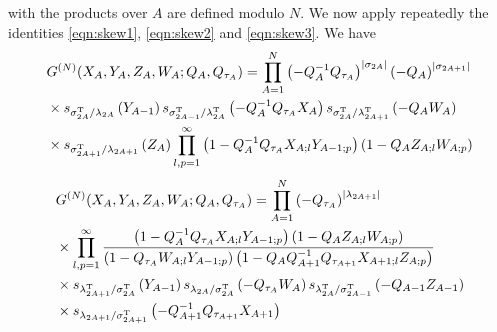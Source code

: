 \documentclass[main.tex]{subfiles}
\begin{document}
with the products over $A$ are defined modulo $N$. We now apply repeatedly the identities \eqref{eqn:skew1}, \eqref{eqn:skew2} and \eqref{eqn:skew3}.
We have
\begin{equation}
\begin{aligned}
&G^{(N)}(X_A,Y_A,Z_A,W_A;Q_A,Q_{\tau_A})=\prod_{A=1}^N\left(-Q^{-1}_{A}Q_{\tau_{A}}\right)^{|\sigma_{2A}|}\left(-Q_A\right)^{|\sigma_{2A+1}|}\\
&\times s_{\sigma_{2A}^{\operatorname{T}}/\lambda_{2A}}\left(Y_{A-1}\right)s_{\sigma_{2A-1}^{\operatorname{T}}/\lambda_{2A}^{\operatorname{T}}}\left(-Q^{-1}_{A}Q_{\tau_{A}}X_A\right)s_{\sigma_{2A}^{\operatorname{T}}/\lambda_{2A+1}^{\operatorname{T}}}\left(-Q_{A}W_A\right)\\
&\times s_{\sigma_{2A+1}^{\operatorname{T}}/\lambda_{2A+1}}\left(Z_{A}\right)\prod_{l,p=1}^{\infty}\left(1-Q^{-1}_{A}Q_{\tau_{A}}X_{A;l}Y_{A-1;p}\right)\left(1-Q_{A}Z_{A;l}W_{A;p}\right)\end{aligned}\label{eqn:step1}
\end{equation}
\begin{equation}
\begin{aligned}
&G^{(N)}(X_A,Y_A,Z_A,W_A;Q_A,Q_{\tau_A})=\prod_{A=1}^N\left(-Q_{\tau_A}\right)^{|\lambda_{2A+1}|}\\
&\times\prod_{l,p=1}^{\infty}\frac{\left(1-Q^{-1}_{A}Q_{\tau_{A}}X_{A;l}Y_{A-1;p}\right)\left(1-Q_{A}Z_{A;l}W_{A;p}\right)}{\left(1-Q_{\tau_{A}}W_{A;l}Y_{A-1;p}\right)\left(1-Q_{A}Q^{-1}_{A+1}Q_{\tau_{A+1}}X_{A+1;l}Z_{A;p}\right)}\\
&\times s_{\lambda_{2A+1}^{\operatorname{T}}/\sigma_{2A}^{\operatorname{T}}}\left(Y_{A-1}\right)s_{\lambda_{2A}/\sigma_{2A}^{\operatorname{T}}}\left(-Q_{\tau_A}W_{A}\right)s_{\lambda_{2A}^{\operatorname{T}}/\sigma_{2A-1}^{\operatorname{T}}}\left(-Q_{A-1}Z_{A-1}\right)\\
&\times s_{\lambda_{2A+1}/\sigma_{2A+1}^{\operatorname{T}}}\left(-Q^{-1}_{A+1}Q_{\tau_{A+1}}X_{A+1}\right)
\end{aligned}
\end{equation}
\end{document}

